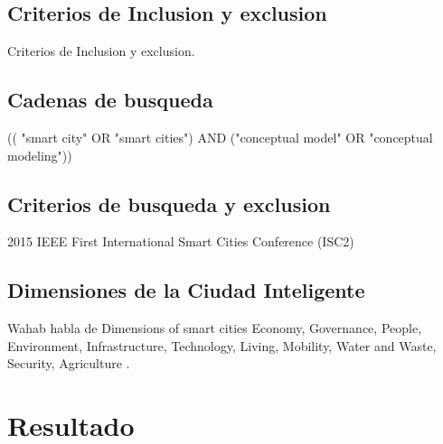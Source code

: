 \documentclass[runningheads,a4paper,spanish]{llncs}
\begin{document}


\subsection{Criterios de Inclusion y exclusion}\label{criterio}

Criterios de Inclusion y exclusion.

\subsection{Cadenas de busqueda}\label{cadena}

(( "smart city" OR "smart cities") AND ("conceptual model" OR "conceptual modeling"))

\subsection{Criterios de busqueda y exclusion}\label{criterios}

2015 IEEE First International Smart Cities Conference (ISC2)

\subsection{Dimensiones de la Ciudad Inteligente}\label{dimensiones}


Wahab habla de Dimensions of smart cities \cite{wahab_systematic_2020}
Economy,
Governance,
People,
Environment,
Infrastructure,
Technology,
Living,
Mobility,
Water and Waste,
Security, 
Agriculture
.



\section{Resultado}\label{resultados}

\end{document}
